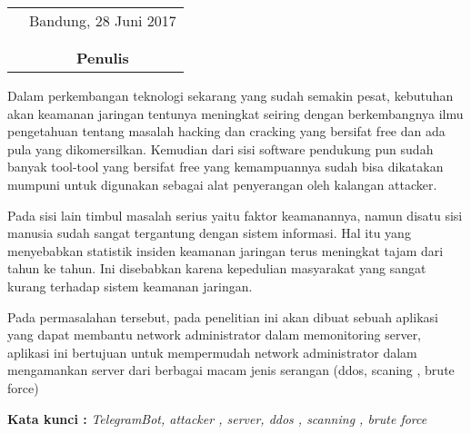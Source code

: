 \documentclass{jtetiskripsi}
\begin{document}
\begin{tabular}{p{7.5cm}c}
&Bandung, 28 Juni 2017\\
&\\
&\\
&\textbf{Penulis}
\end{tabular}

\tableofcontents
{}
\listoftables
{}
\listoffigures
{}


\begin{abstractind}
Dalam perkembangan teknologi sekarang yang sudah semakin pesat, kebutuhan akan keamanan jaringan tentunya meningkat seiring dengan berkembangnya
ilmu pengetahuan tentang masalah hacking dan cracking yang bersifat free dan ada
pula yang dikomersilkan. Kemudian dari sisi software pendukung pun sudah banyak
tool-tool yang bersifat free yang kemampuannya sudah bisa dikatakan mumpuni untuk digunakan sebagai alat penyerangan oleh kalangan attacker.

Pada sisi lain timbul masalah serius yaitu faktor keamanannya, namun disatu
sisi manusia sudah sangat tergantung dengan sistem informasi. Hal itu yang menyebabkan statistik insiden keamanan jaringan terus meningkat tajam dari tahun ke tahun.
Ini disebabkan karena kepedulian masyarakat yang sangat kurang terhadap sistem
keamanan jaringan.


Pada permasalahan tersebut, pada penelitian ini akan dibuat sebuah aplikasi
yang dapat membantu network administrator dalam memonitoring server, aplikasi ini
bertujuan untuk mempermudah network administrator dalam mengamankan server
dari berbagai macam jenis serangan (ddos, scaning , brute force)

\bigskip
\noindent
\textbf{Kata kunci :} \emph{TelegramBot, attacker , server, ddos , scanning , brute force}
\end{abstractind}
\end{document}
